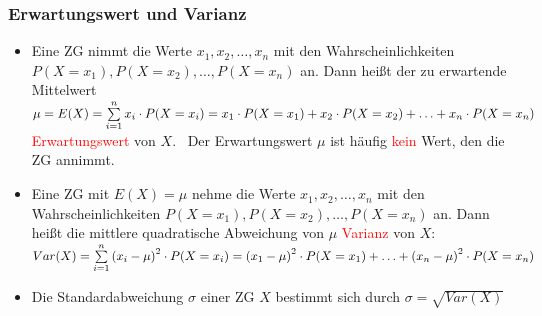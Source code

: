 \documentclass[a4paper,twocolumn,10pt]{onepgnote1}
\renewcommand\mynote{\notebox{Hinweis:}\ }  %
\begin{document}
\subsubsection{Erwartungswert und Varianz}
\begin{itemize}
    \item Eine ZG nimmt die Werte $x_1, x_2,\ldots , x_n$ mit den Wahrscheinlichkeiten $P(X=x_1), P(X=x_2), \ldots, P(X=x_n)$ an. Dann heißt der zu erwartende Mittelwert\\ $ \mu =E(X) = \sum\limits_{i=1}^n x_i\cdot P(X=x_i) \\= x_1\cdot P(X=x_1) + x_2\cdot P(X=x_2) +\ldots + x_n \cdot P(X=x_n)$ \textcolor{red}{Erwartungswert} von $X$. \mynote Der Erwartungswert $\mu$ ist häufig \textcolor{red}{kein} Wert, den die ZG annimmt.
    \item Eine ZG mit $E(X) = \mu$ nehme die Werte $x_1, x_2,\ldots , x_n$ mit den Wahrscheinlichkeiten $P(X=x_1), P(X=x_2), \ldots, P(X=x_n)$ an. Dann heißt die mittlere quadratische Abweichung von $\mu$ \textcolor{red}{Varianz} von $X$: \\ $Var(X) = \sum\limits_{i=1}^n \left(x_i - \mu\right)^2 \cdot P(X = x_i)\\ = \left(x_1 - \mu\right)^2 \cdot P(X = x_1) + \ldots + \left(x_n - \mu\right)^2 \cdot P(X = x_n)$
    \item Die Standardabweichung $\sigma$ einer ZG $X$ bestimmt sich durch $\sigma = \sqrt{Var(X)}$
\end{itemize}
\end{document}
